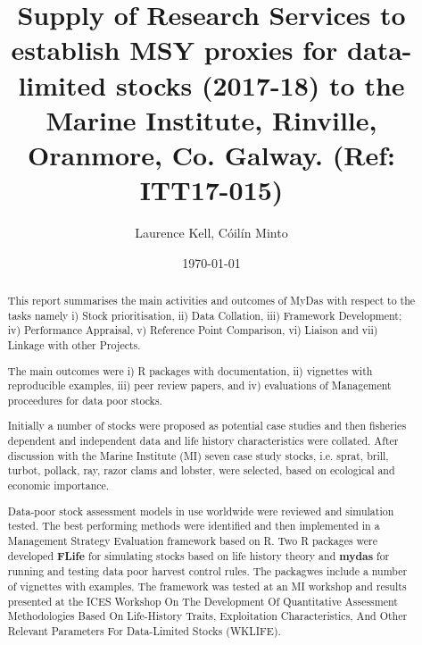 \documentclass[a4paper, 10pt]{article}
\title{Supply of Research Services to establish MSY proxies for data-limited stocks (2017-18) to the Marine Institute, Rinville, Oranmore, Co. Galway.
(Ref: ITT17-015)}
\author{Laurence Kell, C\'oil\'in Minto}
\date{\today}
\begin{document}
\onehalfspacing
{}
\rhead{}

\maketitle
\thispagestyle{fancy}
\pagestyle{empty}

%

\onehalfspacing
{}
\rhead{}

\maketitle
\thispagestyle{fancy}
\pagestyle{empty}

\maketitle

\begin{abstract}

This report summarises the main activities and outcomes of MyDas with respect to the tasks namely i) Stock prioritisation, ii) Data Collation, iii) Framework Development; iv) Performance Appraisal, v) Reference Point Comparison, vi) Liaison and vii) Linkage with other Projects.

The main outcomes were i) R packages with documentation, ii)  vignettes with reproducible examples, iii) peer review papers, and iv) evaluations of Management proceedures for data poor stocks.

Initially a number of stocks were proposed as potential case studies and then fisheries dependent and independent data and life history characteristics were collated.  After discussion with the Marine Institute (MI) seven case study stocks, i.e. sprat, brill, turbot, pollack, ray, razor clams and lobster, were selected, based on ecological and economic importance.

Data-poor stock assessment models in use worldwide were reviewed and simulation tested. The best performing methods were identified and then implemented in a Management Strategy Evaluation framework based on R. Two R packages were developed \textbf{FLife} for simulating stocks based on life history theory and \textbf{mydas} for running and testing data poor harvest control rules. The packagwes include a number of vignettes with examples. The framework was tested at an MI workshop and results presented at the ICES Workshop On The Development Of Quantitative Assessment Methodologies Based On Life-History Traits, Exploitation Characteristics, And Other Relevant Parameters For Data-Limited Stocks (WKLIFE).

\end{abstract}
\end{document}
